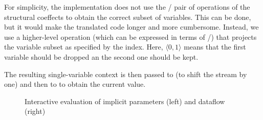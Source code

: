 For simplicity, the implementation does not use the / pair of operations
of the structural coeffects to obtain the correct subset of variables. This can be done, but it
would make the translated code longer and more cumbersome. Instead, we use a higher-level operation
 (which can be expressed in terms of /) that projects the
variable subset as specified by the index. Here, $\langle 0, 1\rangle$ means that the first variable
should be dropped an the second one should be kept.

The resulting single-variable context is then passed to  (to shift the stream by one)
and then to  to obtain the current value.


%
%

\begin{figure}[t]
\caption{Interactive evaluation of implicit parameters (left) and dataflow (right)}
\label{fig:essay-eval}
\end{figure}

